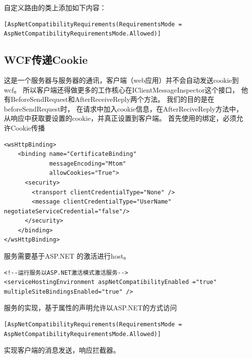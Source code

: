 \documentclass{book}
\begin{document}
自定义路由的类上添加如下内容：

\begin{lstlisting}
[AspNetCompatibilityRequirements(RequirementsMode = AspNetCompatibilityRequirementsMode.Allowed)]
\end{lstlisting}

\subsection{WCF传递Cookie}

这是一个服务器与服务器的通讯，客户端（web应用）并不会自动发送cookie到wcf。
所以客户端还得做更多的工作核心在IClientMessageInspector这个接口，
他有BeforeSendRequest和AfterReceiveReply两个方法。
我们的目的是在beforeSendRequest时，
在请求中加入cookie信息，在AfterReciveReply方法中，
从响应中获取要设置的cookie，并真正设置到客户端。
首先使用的绑定，必须允许Cookie传播

\begin{lstlisting}
<wsHttpBinding>
	<binding name="CertificateBinding" 
	         messageEncoding="Mtom"
	         allowCookies="True">
	  <security>
	    <transport clientCredentialType="None" />
	    <message clientCredentialType="UserName" negotiateServiceCredential="false"/>
	  </security>          
	</binding>
</wsHttpBinding>
\end{lstlisting}

服务需要基于ASP.NET 的激活进行host。

\begin{lstlisting}
<!--运行服务以ASP.NET激活模式激活服务-->
<serviceHostingEnvironment aspNetCompatibilityEnabled ="true" multipleSiteBindingsEnabled="true" />
\end{lstlisting}

服务的实现，基于属性的声明允许以ASP.NET的方式访问

\begin{lstlisting}
[AspNetCompatibilityRequirements(RequirementsMode = AspNetCompatibilityRequirementsMode.Allowed)]
\end{lstlisting}

实现客户端的消息发送，响应拦截器。
\end{document}
